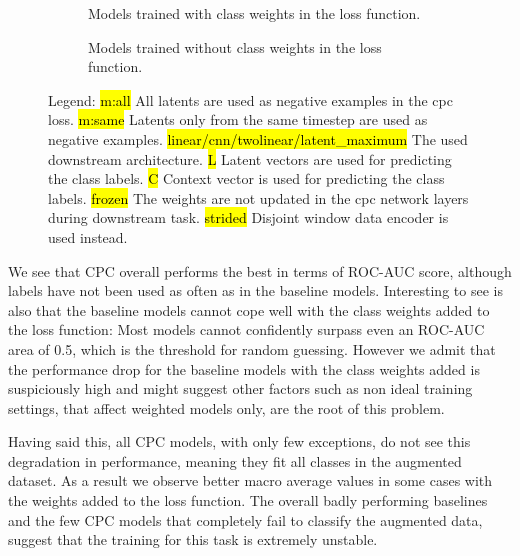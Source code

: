 \begin{figure}[H]
	\begin{subfigure}[t]{0.49\hsize}\centering	
		
		\caption{Models trained with class weights in the loss function.}
		\label{tbl:aucscores-avg-cpc-class-stab}
	\end{subfigure}
	\vline
	\begin{subfigure}[t]{0.49\hsize}\centering %
		
		\caption{Models trained without class weights in the loss function.}
		\label{tbl:aucscores-avg-cpc-noclass-stab}	
	\end{subfigure}	
	\caption*{\small Legend:\newline
		\hl{m:all} All latents are used as negative examples in the cpc loss.
		\hl{m:same} Latents only from the same timestep are used as negative examples.
		\hl{linear/cnn/twolinear/latent\_maximum} The used downstream architecture.
		\hl{L} Latent vectors are used for predicting the class labels.
		\hl{C} Context vector is used for predicting the class labels.
		\hl{frozen} The weights are not updated in the cpc network layers during downstream task.
		\hl{strided} Disjoint window data encoder is used instead.}
	\label{tbl:aucscores-avg-cpc-stab}
\end{figure}
We see that CPC overall performs the best in terms of ROC-AUC score, although labels have not been used as often as in the baseline models. Interesting to see is also that the baseline models cannot cope well with the class weights added to the loss function: Most models cannot confidently surpass even an ROC-AUC area of 0.5, which is the threshold for random guessing. However we admit that the performance drop for the baseline models with the class weights added is suspiciously high and might suggest other factors such as non ideal training settings, that affect weighted models only, are the root of this problem. 

Having said this, all CPC models, with only few exceptions, do not see this degradation in performance, meaning they fit all classes in the augmented dataset. As a result we observe better macro average values in some cases with the weights added to the loss function.
The overall badly performing baselines and the few CPC models that completely fail to classify the augmented data, suggest that the training for this task is extremely unstable.

